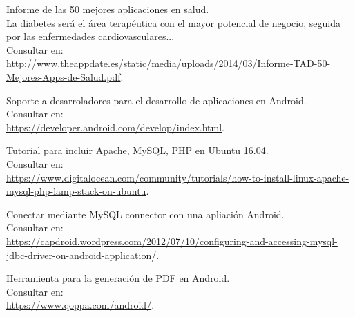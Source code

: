 \documentclass[11pt,spanish,
		listoftables,listoffigures]
		{tfgplantilla}
\begin{document}
\begin{thebibliography}{10}




   Informe de las 50 mejores aplicaciones en salud.\\
   \guillemotleft La diabetes será el área terapéutica con el mayor potencial de negocio, seguida por las enfermedades cardiovasculares... \guillemotright\\
   \newblock Consultar en:\\
   \url{ http://www.theappdate.es/static/media/uploads/2014/03/Informe-TAD-50-Mejores-Apps-de-Salud.pdf}.

   Soporte a desarroladores para el desarrollo de aplicaciones en Android.\\
   \newblock Consultar en:\\
   \url{https://developer.android.com/develop/index.html}.

   Tutorial para incluir Apache, MySQL, PHP en Ubuntu 16.04.\\
   \newblock Consultar en:\\
   \url{https://www.digitalocean.com/community/tutorials/how-to-install-linux-apache-mysql-php-lamp-stack-on-ubuntu}.

   Conectar mediante MySQL connector con una apliación Android.\\
   \newblock Consultar en:\\
   \url{ https://capdroid.wordpress.com/2012/07/10/configuring-and-accessing-mysql-jdbc-driver-on-android-application/}.

   Herramienta para la generación de PDF en Android.\\
   \newblock Consultar en:\\
   \url{ https://www.qoppa.com/android/}.


\end{thebibliography}
\end{document}
